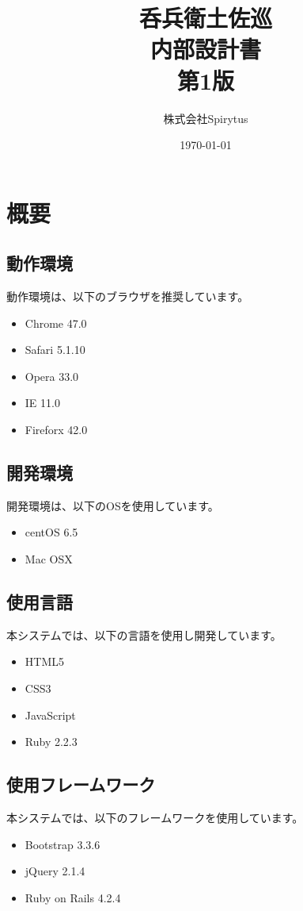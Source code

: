 \documentclass[a4j,titlepage]{jarticle}
\title{呑兵衛土佐巡\\
内部設計書\\
第1版}
\author{株式会社Spirytus}
\date{\today}
\begin{document}
\maketitle
\tableofcontents

\clearpage

\section{概要}
\subsection{動作環境}
動作環境は、以下のブラウザを推奨しています。
\begin{itemize}
\item Chrome 47.0
\item Safari 5.1.10
\item Opera 33.0
\item IE 11.0
\item Fireforx 42.0
\end{itemize}

\subsection{開発環境}
開発環境は、以下のOSを使用しています。
\begin{itemize}
\item centOS 6.5
\item Mac OSX
\end{itemize}

\subsection{使用言語}
本システムでは、以下の言語を使用し開発しています。
\begin{itemize}
\item HTML5
\item CSS3
\item JavaScript
\item Ruby 2.2.3
\end{itemize}

\subsection{使用フレームワーク}
本システムでは、以下のフレームワークを使用しています。
\begin{itemize}
\item Bootstrap 3.3.6
\item jQuery 2.1.4
\item Ruby on Rails 4.2.4
\end{itemize}
\end{document}
